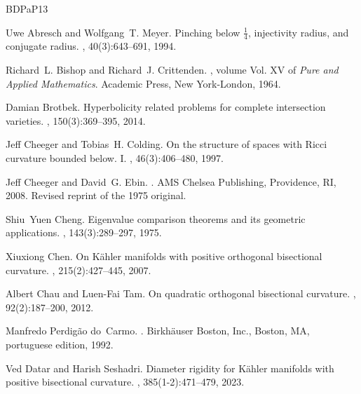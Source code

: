 \documentclass[12pt]{amsart}
\theoremstyle{plain}
\theoremstyle{definition}
\renewcommand{\>}{\rightarrow}
\numberwithin{equation}{section} %
\begin{document}
	
	\noindent
	\def\cprime{$'$} %
	

	
	\begin{thebibliography}{BDPaP13}

		Uwe Abresch and Wolfgang~T. Meyer.
		\newblock Pinching below {$\frac14$}, injectivity radius, and conjugate radius.
		, 40(3):643--691, 1994.
		
		Richard~L. Bishop and Richard~J. Crittenden.
		, volume Vol. XV of {\em Pure and Applied Mathematics}.
		\newblock Academic Press, New York-London, 1964.
		
		Damian Brotbek.
		\newblock Hyperbolicity related problems for complete intersection varieties.
		, 150(3):369--395, 2014.
		
		Jeff Cheeger and Tobias~H. Colding.
		\newblock On the structure of spaces with {R}icci curvature bounded below. {I}.
		, 46(3):406--480, 1997.
		
		Jeff Cheeger and David~G. Ebin.
		.
		\newblock AMS Chelsea Publishing, Providence, RI, 2008.
		\newblock Revised reprint of the 1975 original.
		
		Shiu~Yuen Cheng.
		\newblock Eigenvalue comparison theorems and its geometric applications.
		, 143(3):289--297, 1975.
		
		Xiuxiong Chen.
		\newblock On {K}\"ahler manifolds with positive orthogonal bisectional curvature.
		, 215(2):427--445, 2007.
		
		Albert Chau and Luen-Fai Tam.
		\newblock On quadratic orthogonal bisectional curvature.
		, 92(2):187--200, 2012.
		
		Manfredo Perdig\~ao do~Carmo.
		.
		\newblock Birkh\"auser Boston, Inc., Boston, MA, portuguese edition, 1992.
		
		Ved Datar and Harish Seshadri.
		\newblock Diameter rigidity for {K}\"ahler manifolds with positive bisectional curvature.
		, 385(1-2):471--479, 2023.
		

\end{thebibliography}
\end{document}
